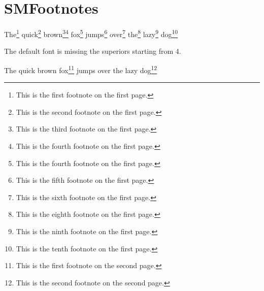 \documentclass[class=scrartcl,crop=false]{standalone}
\begin{document}
\section{SMFootnotes}

The\footnote{This is the first footnote on the first page.} quick\footnote{This is the second footnote on the first page.} brown\footnote{This is the third footnote on the first page.}\footnote{This is the fourth footnote on the first page.} fox\footnote{This is the fourth footnote on the first page.} jumps\footnote{This is the fifth footnote on the first page.} over\footnote{This is the sixth footnote on the first page.} the\footnote{This is the eighth footnote on the first page.} lazy\footnote{This is the ninth footnote on the first page.} dog\footnote{This is the tenth footnote on the first page.}

The default font is missing the superiors starting from 4.

\newpage

The quick brown fox\footnote{This is the first footnote on the second page.} jumps over the lazy dog\footnote{This is the second footnote on the second page.}
\end{document}
